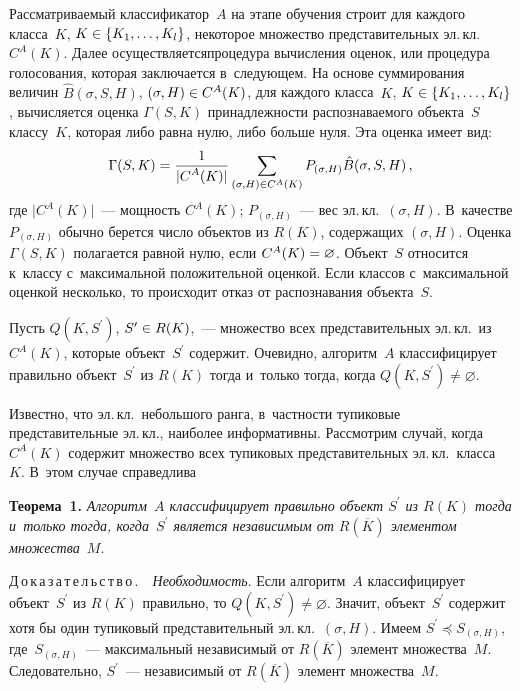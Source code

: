 \begin{multicols}{2}
  Рассматриваемый классификатор~$A$ на этапе обучения строит для каждого 
класса~$K$, $K\hm\in \{K_1, \ldots , K_l\}$, некоторое множество 
представительных эл.\,кл.\ $C^A(K)$. Далее осуществляется\linebreak процедура 
вычисления оценок, или процедура голосования, которая заключается 
в~сле\-ду\-ющем. На основе суммирования величин $\hat{B}(\sigma, S, H)$, $(\sigma, 
H)\hm\in C^A(K)$, для каждого класса~$K$, $K\hm\in \{K_1, \ldots , K_l\}$, 
вычисляется оценка $\Gamma(S,K)$ принадлежности распознаваемого 
объекта~$S$ классу~$K$, которая либо равна нулю, либо больше нуля. Эта 
оценка имеет вид:
  $$
  \Gamma(S,K) =\displaystyle\frac{\displaystyle 1\mathstrut}{\displaystyle \vert C^A(K)\vert\mathstrut} \sum\limits_{(\sigma,H)\in C^A(K)} 
P_{(\sigma, H)} \hat{B}(\sigma, S, H)\,,
  $$
где $\vert C^A(K)\vert $~--- мощность $C^A(K)$; $ P_{(\sigma, H)}$~--- вес 
эл.\,кл.\ $(\sigma, H)$. В~качестве $P_{(\sigma, H)}$ обычно берется число 
объектов из $R(K)$, содержащих $(\sigma, H)$. Оценка $\Gamma(S,K)$ 
полагается равной нулю, если $C^A(K)\hm= \varnothing$. Объект~$S$ относится к~классу с~максимальной положительной оценкой. Если классов 
с~максимальной оценкой несколько, то происходит отказ от распознавания 
объекта~$S$.
  
  Пусть $Q(K, S^\prime)$, $S^\prime\hm\in R(K)$,~--- множество всех 
представительных эл.\,кл.\ из $C^A(K)$, которые объект~$S^\prime$ содержит. 
Очевидно, алгоритм~$A$ классифицирует правильно объект~$S^\prime$ из 
$R(K)$ тогда и~только тогда, когда $Q(K,S^\prime)\not= \varnothing$.
  
  Известно, что эл.\,кл.\ небольшого ранга, в~частности тупиковые 
представительные эл.\,кл., наиболее информативны. Рассмотрим случай, когда 
$C^A(K)$ содержит множество всех тупиковых представительных эл.\,кл.\ 
класса~$K$. В~этом случае справедлива
  
  
  \noindent
  \textbf{Теорема~1.} \textit{Алгоритм~$A$ классифицирует правильно объект 
$S^\prime$ из $R(K)$ тогда и~только тогда, когда~$S^\prime$ является 
независимым от $R(\overline{K})$ элементом множества~$M$}.
  
  \smallskip
  
  \noindent
  Д\,о\,к\,а\,з\,а\,т\,е\,л\,ь\,с\,т\,в\,о\,.\ \ \textit{Необходимость}. Если 
алгоритм~$A$ классифицирует объект~$S^\prime$ из $R(K)$ правильно, то 
$Q(K,S^\prime) \not= \varnothing$. Значит, объект~$S^\prime$ содержит хотя бы 
один тупиковый представительный эл.\,кл.\ $(\sigma, H)$. Имеем $S^\prime 
\preceq S_{(\sigma, H)}$, где~$S_{(\sigma, H)}$~--- максимальный независимый от 
$R(\overline{K})$ элемент множества~$M$. Следовательно, $S^\prime$~--- 
независимый от $R(\overline{K})$ элемент множества~$M$. 
  

\end{multicols}
